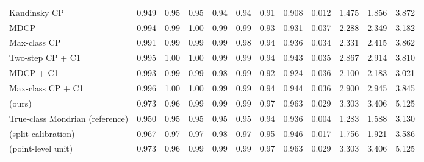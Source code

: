 \begin{table}[!htbp]
{\begin{tabular}{lccccccccccc}
Kandinsky CP & 0.949 & 0.95 & 0.95 & 0.94 & 0.94 & 0.91 & 0.908 & 0.012 & 1.475 & 1.856 & 3.872 \\
MDCP & 0.994 & 0.99 & 1.00 & 0.99 & 0.99 & 0.93 & 0.931 & 0.037 & 2.288 & 2.349 & 3.182 \\
Max-class CP & 0.991 & 0.99 & 0.99 & 0.99 & 0.98 & 0.94 & 0.936 & 0.034 & 2.331 & 2.415 & 3.862 \\
Two-step CP + C1 & 0.995 & 1.00 & 1.00 & 0.99 & 0.99 & 0.94 & 0.943 & 0.035 & 2.867 & 2.914 & 3.810 \\
MDCP + C1 & 0.993 & 0.99 & 0.99 & 0.98 & 0.99 & 0.92 & 0.924 & 0.036 & 2.100 & 2.183 & 3.021 \\
Max-class CP + C1 & 0.996 & 1.00 & 1.00 & 0.99 & 0.99 & 0.94 & 0.944 & 0.036 & 2.900 & 2.945 & 3.845 \\
\gamut{} (ours) & 0.973 & 0.96 & 0.99 & 0.99 & 0.99 & 0.97 & 0.963 & 0.029 & 3.303 & 3.406 & 5.125 \\
True-class Mondrian (reference) & 0.950 & 0.95 & 0.95 & 0.95 & 0.95 & 0.94 & 0.936 & 0.004 & 1.283 & 1.588 & 3.130 \\
\gamut{} (split calibration) & 0.967 & 0.97 & 0.97 & 0.98 & 0.97 & 0.95 & 0.946 & 0.017 & 1.756 & 1.921 & 3.586 \\
\gamut{} (point-level unit) & 0.973 & 0.96 & 0.99 & 0.99 & 0.99 & 0.97 & 0.963 & 0.029 & 3.303 & 3.406 & 5.125 \\
\bottomrule
\end{tabular}}
\end{table}
\FloatBarrier
